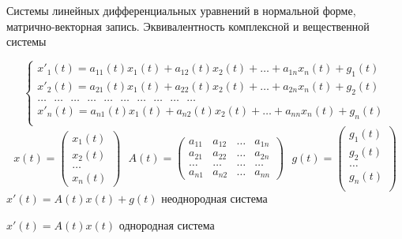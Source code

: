 \begin{title}[\Large]
  Системы линейных дифференциальных уравнений в нормальной форме,
  матрично-векторная запись. Эквивалентность комплексной и вещественной системы
\end{title}

\begin{define}
  $$
  \left\{
  \begin{array}{l}
    x'_1(t) = a_{11}(t)x_1(t) + a_{12}(t)x_2(t) + \ldots
    + a_{1n}x_n(t) + g_1(t) \\
    x'_2(t) = a_{21}(t)x_1(t) + a_{22}(t)x_2(t) + \ldots
    + a_{2n}x_n(t) + g_2(t) \\
    \ldots ~~~ \ldots ~~~ \ldots ~~~ \ldots ~~~ \ldots ~~~ \ldots ~~~
    \ldots ~~~ \ldots ~~~ \ldots ~~~ \ldots\\
    x'_n(t) = a_{n1}(t)x_1(t) + a_{n2}(t)x_2(t) + \ldots
    + a_{nn}x_n(t) + g_n(t) \\
  \end{array}
  \right.
  $$
  $$
  x(t) =
  \left(
  \begin{array}{l}
    x_1(t) \\
    x_2(t) \\
    \ldots \\
    x_n(t)
  \end{array}
  \right) ~~~
  A(t) =
  \left(
  \begin{array}{cccc}
    a_{11} & a_{12} & \ldots & a_{1n} \\
    a_{21} & a_{22} & \ldots & a_{2n} \\
    \ldots & \ldots & \ldots & \ldots \\
    a_{n1} & a_{n2} & \ldots & a_{nn}
  \end{array}
  \right) ~~~
  g(t) =
  \left(
  \begin{array}{l}
    g_1(t) \\
    g_2(t) \\
    \ldots \\
    g_n(t) \\
  \end{array}
  \right)
  $$
  $x'(t) = A(t)x(t) + g(t)$ неоднородная система

  $x'(t) = A(t)x(t)$ однородная система
\end{define}

